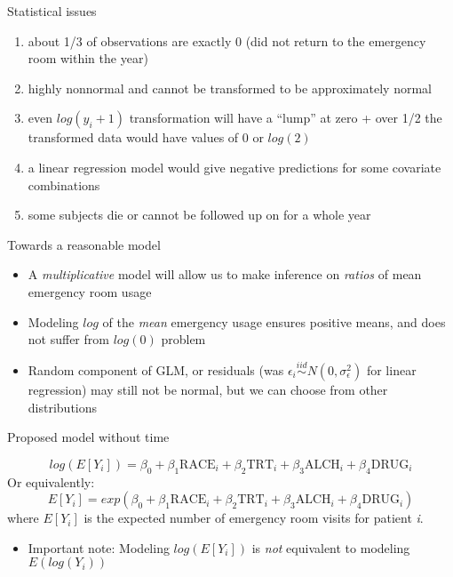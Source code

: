 \documentclass[ignorenonframetext,]{beamer}
\providecommand{\tightlist}{%
  \setlength{\itemsep}{0pt}\setlength{\parskip}{0pt}}
\begin{document}
\begin{frame}{Statistical issues}
\protect\hypertarget{statistical-issues}{}

\begin{enumerate}
\tightlist
\item
  about 1/3 of observations are exactly 0 (did not return to the
  emergency room within the year)
\item
  highly nonnormal and cannot be transformed to be approximately normal
\item
  even \(log(y_i + 1)\) transformation will have a ``lump'' at zero +
  over 1/2 the transformed data would have values of 0 or \(log(2)\)
\item
  a linear regression model would give negative predictions for some
  covariate combinations
\item
  some subjects die or cannot be followed up on for a whole year
\end{enumerate}

\end{frame}

\begin{frame}{Towards a reasonable model}
\protect\hypertarget{towards-a-reasonable-model}{}

\begin{itemize}
\tightlist
\item
  A \emph{multiplicative} model will allow us to make inference on
  \emph{ratios} of mean emergency room usage
\item
  Modeling \(log\) of the \emph{mean} emergency usage ensures positive
  means, and does not suffer from \(log(0)\) problem
\item
  Random component of GLM, or residuals (was
  \(\epsilon_i \stackrel{iid}{\sim} N(0, \sigma_\epsilon^2)\) for linear
  regression) may still not be normal, but we can choose from other
  distributions
\end{itemize}

\end{frame}

\begin{frame}{Proposed model without time}
\protect\hypertarget{proposed-model-without-time}{}

\[
log(E[Y_i]) = \beta_0 + \beta_1 \textrm{RACE}_i + \beta_2 \textrm{TRT}_i + \beta_3 \textrm{ALCH}_i + \beta_4 \textrm{DRUG}_i
\] Or equivalently: \[
E[Y_i] = exp \left( \beta_0 + \beta_1 \textrm{RACE}_i + \beta_2 \textrm{TRT}_i + \beta_3 \textrm{ALCH}_i + \beta_4 \textrm{DRUG}_i \right)
\] where \(E[Y_i]\) is the expected number of emergency room visits for
patient \emph{i}.

\begin{itemize}
\tightlist
\item
  Important note: Modeling \(log(E[Y_i])\) is \emph{not} equivalent to
  modeling \(E(log(Y_i))\)
\end{itemize}

\end{frame}
\end{document}
